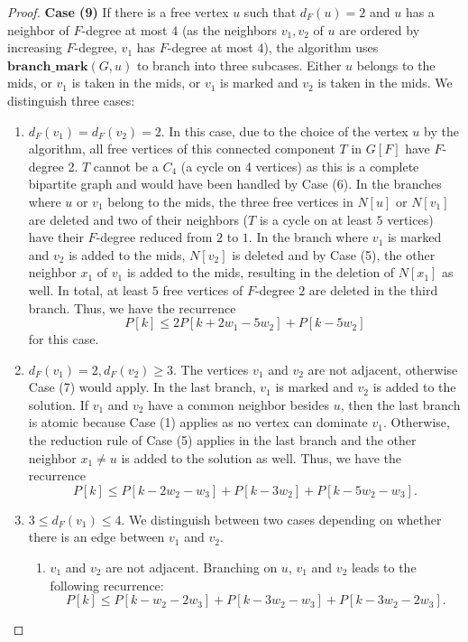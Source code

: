 \documentclass[a4paper,10pt]{article}
\theoremstyle{plain}
\theoremstyle{definition}
\theoremstyle{remark}
\newcommand{\mids}{mids\xspace}
\newcommand{\branchm}{\mathbf{branch\_mark}}
\begin{document}
\begin{proof}
{\bf Case (9)}
If there is a free vertex $u$ such that $d_F(u)=2$ and $u$ has a neighbor
of $F$-degree at most $4$ (as the neighbors $v_1,v_2$ of $u$ are ordered by increasing
$F$-degree, $v_1$ has $F$-degree at most $4$), the algorithm uses $\branchm(G,u)$ to branch into three subcases. 
Either $u$ belongs to the \mids, or $v_1$ is
taken in the \mids, or $v_1$ is marked and $v_2$ is taken in the \mids.
We distinguish three cases:
\begin{enumerate}
\item $d_F(v_1)=d_F(v_2)=2$. In this case, due to the choice of the vertex $u$
by the algorithm, all free vertices of this connected component $T$ in
$G[F]$ have $F$-degree 2. $T$ cannot be a $C_4$ (a cycle on 4 vertices)
as this is a complete bipartite graph and would have
been handled by Case (6).
In the branches where $u$ or $v_1$ belong to the \mids, the three free vertices
in $N[u]$ or $N[v_1]$ are deleted and two of their neighbors ($T$ is a cycle on
at least $5$ vertices) have their $F$-degree reduced from $2$ to $1$.
In the branch where $v_1$ is marked and $v_2$ is added to the \mids, 
$N[v_2]$ is deleted and by Case (5), the other neighbor $x_1$ of $v_1$ is
added to the \mids, resulting in the deletion of $N[x_1]$ as well. In total,
at least $5$ free vertices of $F$-degree $2$ are deleted in the third branch.
Thus, we have the recurrence
\begin{equation}
P[k] \leq 2 P[k+2w_1-5w_2] + P[k-5w_2]
\end{equation}
for this case.

\item $d_F(v_1)=2, d_F(v_2) \ge 3$. The vertices $v_1$ and $v_2$ are not adjacent,
otherwise Case (7) would apply. In the last branch, $v_1$ is marked and $v_2$ is added
to the solution. If $v_1$ and $v_2$ have a common neighbor besides $u$, then the last
branch is atomic because Case (1) applies as no vertex can dominate $v_1$. Otherwise, the
reduction rule of Case (5) applies in the last branch and the other neighbor $x_1 \not = u$
is added to the solution as well. Thus, we have the recurrence
\begin{equation}
P[k] \leq P[k-2w_2-w_3] + P[k-3w_2] + P[k-5w_2-w_3].
\end{equation}

\item $3\le d_F(v_1) \le 4$. We distinguish between two cases depending on whether there 
is an edge between $v_1$ and $v_2$.
\begin{enumerate}
\item $v_1$ and $v_2$ are not adjacent. Branching on $u$, $v_1$ and $v_2$
leads to the following recurrence:
\begin{equation}
P[k] \leq P[k-w_2-2w_3]+P[k-3w_2-w_3]+P[k-3w_2-2w_3].
\end{equation}


\end{enumerate}
\end{enumerate}
\end{proof}
\end{document}

